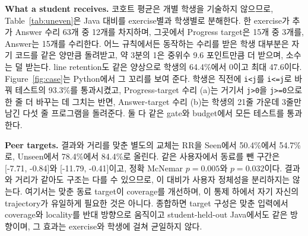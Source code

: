 \documentclass[10pt,conference]{IEEEtran}
\begin{document}
\noindent\textbf{What a student receives.} 코호트 평균은 개별 학생을 기술하지 않으므로, Table~\ref{tab:uneven}은 Java 대비를 exercise별과 학생별로 분해한다. 한 exercise가 추가 Answer 수리 63개 중 12개를 차지하며, 그곳에서 Progress target은 15개 중 3개를, Answer는 15개를 수리한다. 어느 규칙에서든 동작하는 수리를 받은 학생 대부분은 자기 코드를 같은 양만큼 돌려받고, 약 3분의 1은 중위수 9.6 포인트만큼 더 받으며, 소수는 덜 받는다. line retention도 같은 양상으로 학생의 64.4\%에서 0이고 최대 47.6이다. Figure~\ref{fig:case}는 Python에서 그 꼬리를 보여 준다. 학생은 직전에 \texttt{i<j}를 \texttt{i<=j}로 바꿔 테스트의 93.3\%를 통과시켰고, Progress-target 수리 (a)는 거기서 \texttt{j>0}을 \texttt{j>=0}으로 한 줄 더 바꾸는 데 그치는 반면, Answer-target 수리 (b)는 학생의 21줄 가운데 3줄만 남긴 다섯 줄 프로그램을 돌려준다. 둘 다 같은 gate와 budget에서 모든 테스트를 통과한다.

\noindent\textbf{Peer targets.} 결과와 거리를 맞춘 별도의 교체는 RR을 Seen에서 50.4\%에서 54.7\%로, Unseen에서 78.4\%에서 84.4\%로 올린다. 같은 사용자에서 동료를 뺀 구간은 [-7.71, -0.84]와 [-11.79, -0.41]이고, 정확 McNemar \(p=0.005\)와 \(p=0.032\)이다. 결과와 거리가 같아도 구조는 다를 수 있으므로, 이 대비가 사용자 정체성을 분리하지는 않는다. 여기서는 맞춘 동료 target이 coverage를 개선하며, 이 통제 하에서 자기 자신의 trajectory가 유일하게 필요한 것은 아니다. 종합하면 target 구성은 맞춘 입력에서 coverage와 locality를 반대 방향으로 움직이고 student-held-out Java에서도 같은 방향이며, 그 효과는 exercise와 학생에 걸쳐 균일하지 않다.
\end{document}
